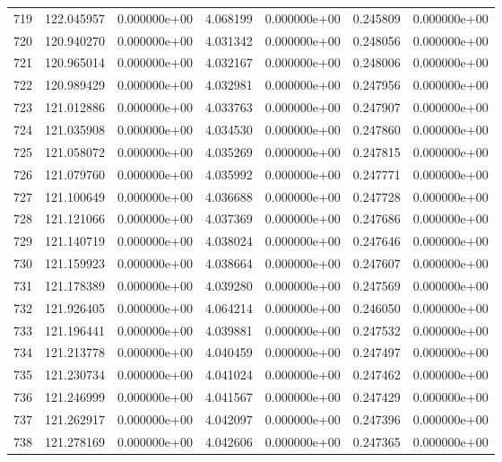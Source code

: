 \begin{tabular}{rrrrrrr}
 719 & 122.045957 &  0.000000e+00 &  4.068199 &  0.000000e+00 &   0.245809 &  0.000000e+00 \\
 720 & 120.940270 &  0.000000e+00 &  4.031342 &  0.000000e+00 &   0.248056 &  0.000000e+00 \\
 721 & 120.965014 &  0.000000e+00 &  4.032167 &  0.000000e+00 &   0.248006 &  0.000000e+00 \\
 722 & 120.989429 &  0.000000e+00 &  4.032981 &  0.000000e+00 &   0.247956 &  0.000000e+00 \\
 723 & 121.012886 &  0.000000e+00 &  4.033763 &  0.000000e+00 &   0.247907 &  0.000000e+00 \\
 724 & 121.035908 &  0.000000e+00 &  4.034530 &  0.000000e+00 &   0.247860 &  0.000000e+00 \\
 725 & 121.058072 &  0.000000e+00 &  4.035269 &  0.000000e+00 &   0.247815 &  0.000000e+00 \\
 726 & 121.079760 &  0.000000e+00 &  4.035992 &  0.000000e+00 &   0.247771 &  0.000000e+00 \\
 727 & 121.100649 &  0.000000e+00 &  4.036688 &  0.000000e+00 &   0.247728 &  0.000000e+00 \\
 728 & 121.121066 &  0.000000e+00 &  4.037369 &  0.000000e+00 &   0.247686 &  0.000000e+00 \\
 729 & 121.140719 &  0.000000e+00 &  4.038024 &  0.000000e+00 &   0.247646 &  0.000000e+00 \\
 730 & 121.159923 &  0.000000e+00 &  4.038664 &  0.000000e+00 &   0.247607 &  0.000000e+00 \\
 731 & 121.178389 &  0.000000e+00 &  4.039280 &  0.000000e+00 &   0.247569 &  0.000000e+00 \\
 732 & 121.926405 &  0.000000e+00 &  4.064214 &  0.000000e+00 &   0.246050 &  0.000000e+00 \\
 733 & 121.196441 &  0.000000e+00 &  4.039881 &  0.000000e+00 &   0.247532 &  0.000000e+00 \\
 734 & 121.213778 &  0.000000e+00 &  4.040459 &  0.000000e+00 &   0.247497 &  0.000000e+00 \\
 735 & 121.230734 &  0.000000e+00 &  4.041024 &  0.000000e+00 &   0.247462 &  0.000000e+00 \\
 736 & 121.246999 &  0.000000e+00 &  4.041567 &  0.000000e+00 &   0.247429 &  0.000000e+00 \\
 737 & 121.262917 &  0.000000e+00 &  4.042097 &  0.000000e+00 &   0.247396 &  0.000000e+00 \\
 738 & 121.278169 &  0.000000e+00 &  4.042606 &  0.000000e+00 &   0.247365 &  0.000000e+00 \\

\end{tabular}
